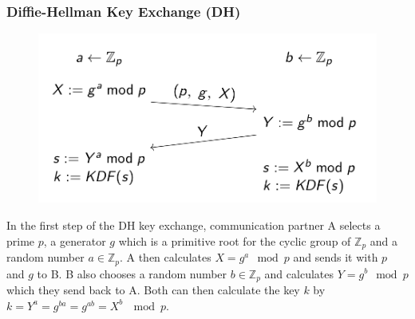\subsubsection{Diffie-Hellman Key Exchange (DH)}
\begin{figure}[H]
  \centering
  \includegraphics[width=.7\textwidth]{figures/diffie-hellmann.png}
\end{figure}
In the first step of the DH key exchange, communication partner A selects a prime $p$, a generator $g$ which is a primitive root for the cyclic group of $\mathds{Z}_p$ and a random number $a \in \mathds{Z}_p$.
A then calculates $X = g^a \mod p$ and sends it with $p$ and $g$ to B.
B also chooses a random number $b \in \mathds{Z}_p$ and calculates $Y = g^b \mod p$ which they send back to A.
Both can then calculate the key $k$ by $k = Y^a = g^{ba} = g^{ab} = X^b~\mod p$.
